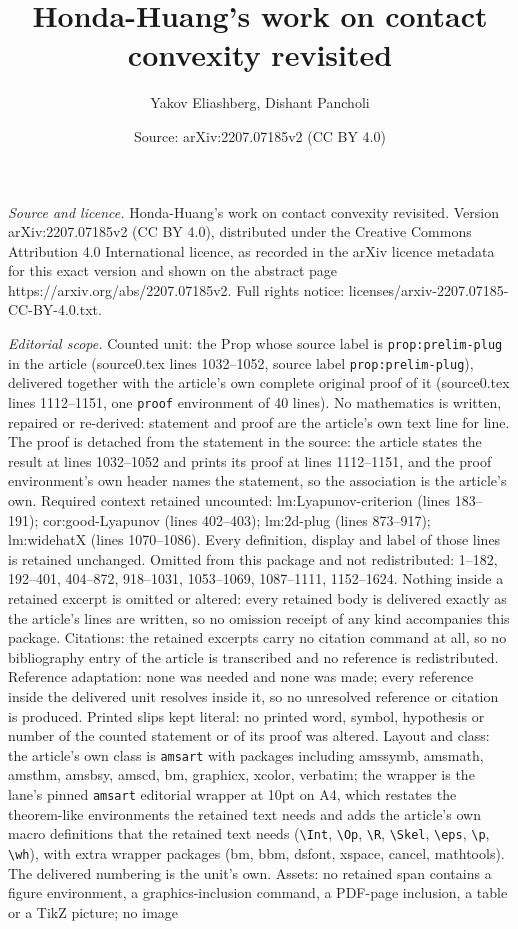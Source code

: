 \documentclass[10pt,a4paper]{amsart}
\title[Honda-Huang's work on contact convexity revisited]{Honda-Huang's work on contact convexity revisited}
\author{Yakov Eliashberg, Dishant Pancholi}
\date{Source: arXiv:2207.07185v2 (CC BY 4.0)}
\begin{document}
\maketitle

\noindent\emph{Source and licence.} Honda-Huang's work on contact convexity revisited. Version arXiv:2207.07185v2 (CC BY 4.0), distributed under the Creative Commons Attribution 4.0 International licence, as recorded in the arXiv licence metadata for this exact version and shown on the abstract page https://arxiv.org/abs/2207.07185v2. Full rights notice: licenses/arxiv-2207.07185-CC-BY-4.0.txt.\par\smallskip

\noindent\textit{Editorial scope.} Counted unit: the Prop whose source label is \texttt{prop:prelim-plug} in the article (source0.tex lines 1032--1052, source label \texttt{prop:prelim-plug}), delivered together with the article's own complete original proof of it (source0.tex lines 1112--1151, one \texttt{proof} environment of 40 lines). No mathematics is written, repaired or re-derived: statement and proof are the article's own text line for line. The proof is detached from the statement in the source: the article states the result at lines 1032--1052 and prints its proof at lines 1112--1151, and the proof environment's own header names the statement, so the association is the article's own. Required context retained uncounted: lm:Lyapunov-criterion (lines 183--191); cor:good-Lyapunov (lines 402--403); lm:2d-plug (lines 873--917); lm:widehatX (lines 1070--1086). Every definition, display and label of those lines is retained unchanged. Omitted from this package and not redistributed: 1--182, 192--401, 404--872, 918--1031, 1053--1069, 1087--1111, 1152--1624. Nothing inside a retained excerpt is omitted or altered: every retained body is delivered exactly as the article's lines are written, so no omission receipt of any kind accompanies this package. Citations: the retained excerpts carry no citation command at all, so no bibliography entry of the article is transcribed and no reference is redistributed. Reference adaptation: none was needed and none was made; every reference inside the delivered unit resolves inside it, so no unresolved reference or citation is produced. Printed slips kept literal: no printed word, symbol, hypothesis or number of the counted statement or of its proof was altered. Layout and class: the article's own class is \texttt{amsart} with packages including amssymb, amsmath, amsthm, amsbsy, amscd, bm, graphicx, xcolor, verbatim; the wrapper is the lane's pinned \texttt{amsart} editorial wrapper at 10pt on A4, which restates the theorem-like environments the retained text needs and adds the article's own macro definitions that the retained text needs (\texttt{\textbackslash Int}, \texttt{\textbackslash Op}, \texttt{\textbackslash R}, \texttt{\textbackslash Skel}, \texttt{\textbackslash eps}, \texttt{\textbackslash p}, \texttt{\textbackslash wh}), with extra wrapper packages (bm, bbm, dsfont, xspace, cancel, mathtools). The delivered numbering is the unit's own. Assets: no retained span contains a figure environment, a graphics-inclusion command, a PDF-page inclusion, a table or a TikZ picture; no image 
\end{document}
